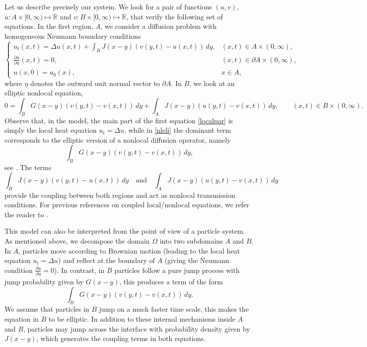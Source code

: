 \documentclass[reqno]{amsart}
\numberwithin{equation}{section}
\begin{document}
Let us describe precisely our system. We look for a pair of functions $(u,v)$,
$u:A\times [0,\infty) \mapsto \mathbb{R}$ and  $v:B\times [0,\infty) \mapsto \mathbb{R}$, that verify the following set of equations. In the first region, $A$, we consider a diffusion problem with homogeneous Neumann boundary conditions
\begin{equation}\label{localpar}
\begin{cases}
    \displaystyle u_t(x,t)=\Delta u(x,t)+ \int_B J(x-y)(v(y,t)-u(x,t))\,dy, &  (x,t)\in A\times (0,\infty),  \\
    \displaystyle \frac{\partial u}{\partial \eta}(x,t)=0, & (x,t)\in \partial A \times (0,\infty),\\
    u(x,0)=u_0(x), & x\in A,
\end{cases}
\end{equation}
where $\eta$ denotes the outward unit normal vector to $\partial A$. In $B$, we look at an elliptic nonlocal equation,
\begin{equation}\label{nleli}
   0 = \int_B G(x-y)(v(y,t)-v(x,t))\,dy
        +\int_A J(x-y)(u(y,t)-v(x,t))\,dy,
   \qquad (x,t)\in B\times (0,\infty).
\end{equation}
Observe that, in the model, the main part of the first equation \eqref{localpar} is simply the local heat equation $u_t=\Delta u$, while in \eqref{nleli} the dominant term corresponds to the elliptic version of a nonlocal diffusion operator, namely
\[
\int_B G(x-y)(v(y,t)-v(x,t))\,dy,
\]
see \cite{julio}. The terms
\[
\int_B J(x-y)(v(y,t)-u(x,t))\,dy
\quad\text{and}\quad
\int_A J(x-y)(u(y,t)-v(x,t))\,dy
\]
provide the coupling between both regions and act as nonlocal transmission conditions. 
For previous references on coupled local/nonlocal equations, we refer the reader to \cite{acosta,monia,
DEliaPeregoBochevLittlewood16,bruna,DuLiLuTian18,GalWarma17,quiros,Kriventsov15}.

This model can also be interpreted from the point of view of a particle system. As mentioned above, we decompose the domain $\Omega$ into two subdomains $A$ and $B$. In $A$, particles move according to Brownian motion (leading to the local heat equation $u_t=\Delta u$) and reflect at the boundary of $A$ (giving the Neumann condition $\frac{\partial u}{\partial \eta}=0$). In contrast, in $B$ particles follow a pure jump process with jump probability given by $G(x-y)$, 
this produces a term of the form
\[
\int_B G(x-y)(v(y,t)-v(x,t))\,dy.
\]
We assume that particles in $B$ jump on a much faster time scale, this makes the equation in $B$ to be elliptic.  
In addition to these internal mechanisms inside $A$ and $B$, particles may jump across the interface with probability density given by $J(x-y)$, which generates the coupling terms in both equations.
\end{document}
